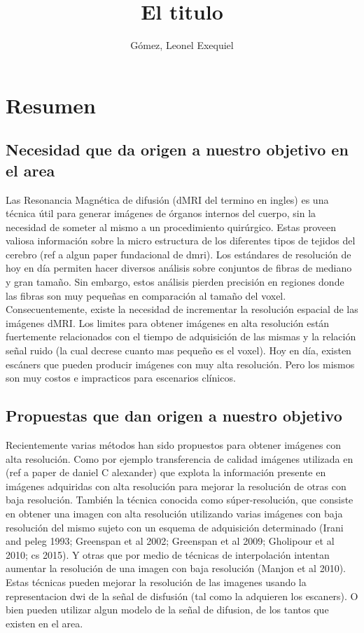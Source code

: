 \documentclass[a4paper,10pt]{article}
\title{El titulo}
\author{Gómez, Leonel Exequiel}
\begin{document}
\maketitle

\section{Resumen}

\subsection{Necesidad que da origen a nuestro objetivo en el area}
Las Resonancia Magnética de difusión (dMRI del termino en ingles) 
es una técnica útil para generar imágenes de órganos internos del cuerpo, sin 
la necesidad de someter al mismo a un procedimiento quirúrgico. Estas 
proveen valiosa información sobre la micro estructura de los diferentes 
tipos de tejidos del cerebro (ref a algun paper fundacional de dmri). Los 
estándares de resolución de hoy en día permiten hacer diversos análisis sobre 
conjuntos de fibras de mediano y gran tamaño. Sin embargo, estos análisis 
pierden precisión en regiones donde las fibras son muy pequeñas en comparación 
al tamaño del voxel. Consecuentemente, existe la necesidad de 
incrementar la resolución espacial de las imágenes dMRI. Los limites para 
obtener imágenes en alta resolución están fuertemente relacionados con el 
tiempo de adquisición de las mismas y la relación señal ruido (la cual decrese 
cuanto mas pequeño es el voxel). Hoy en día, existen escáners que pueden 
producir imágenes con muy alta resolución. Pero los mismos son muy costos e 
impracticos para escenarios clínicos.


\subsection{Propuestas que dan origen a nuestro objetivo}
Recientemente varias métodos han sido propuestos para obtener imágenes con 
alta resolución. Como por ejemplo transferencia de calidad imágenes utilizada 
en (ref a paper de daniel C alexander) que explota la información presente en 
imágenes adquiridas con alta resolución para mejorar la resolución de otras con 
baja resolución. También la técnica conocida como súper-resolución, que 
consiste en obtener una imagen con alta resolución utilizando varias 
imágenes con baja resolución del mismo sujeto con un esquema de 
adquisición determinado (Irani and peleg 1993; Greenspan et al 2002; Greenspan 
et al 2009; Gholipour et al 2010; cs 2015). Y otras que por medio de técnicas 
de interpolación intentan aumentar la resolución de una imagen con baja 
resolución (Manjon et al 2010). Estas técnicas pueden mejorar la resolución de 
las imagenes usando la representacion dwi de la señal de disfusión (tal como la 
adquieren los escaners). O bien pueden utilizar algun modelo de la señal de 
difusion, de los tantos que existen en el area.
\end{document}
